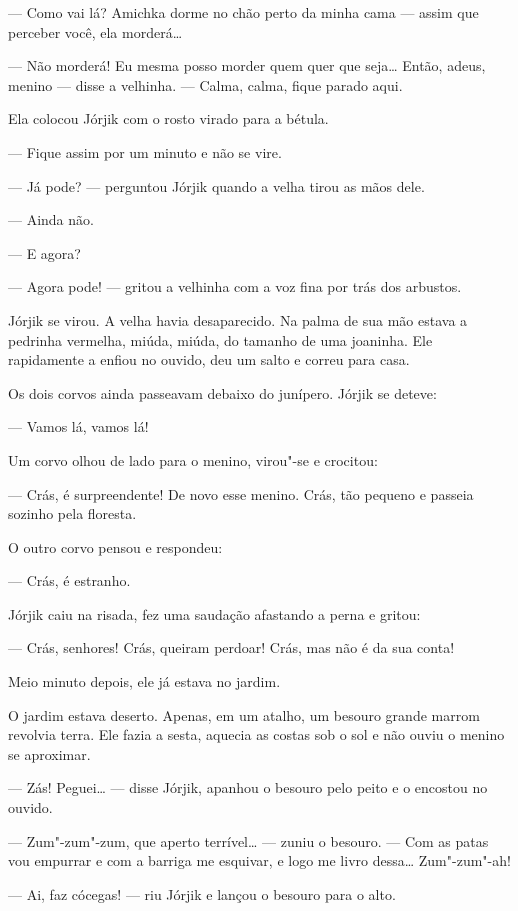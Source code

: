 --- Como vai lá? Amichka dorme no chão perto da minha cama --- assim que perceber você, ela morderá\ldots{}

--- Não morderá! Eu mesma posso morder quem quer que seja\ldots{} Então,
adeus, menino --- disse a velhinha. --- Calma, calma, fique parado aqui.

Ela colocou Jórjik com o rosto virado para a bétula.

--- Fique assim por um minuto e não se vire.

--- Já pode? --- perguntou Jórjik quando a velha tirou as mãos dele.

--- Ainda não.

--- E agora?

--- Agora pode! --- gritou a velhinha com a voz fina por trás dos
arbustos.

Jórjik se virou. A velha havia desaparecido. Na palma de sua mão estava
a pedrinha vermelha, miúda, miúda, do tamanho de uma joaninha. Ele
rapidamente a enfiou no ouvido, deu um salto e correu para casa.

Os dois corvos ainda passeavam debaixo do junípero. Jórjik se deteve:

--- Vamos lá, vamos lá!

Um corvo olhou de lado para o menino, virou"-se e crocitou:

--- Crás, é surpreendente! De novo esse menino. Crás, tão pequeno e
passeia sozinho pela floresta.

O outro corvo pensou e respondeu:

--- Crás, é estranho.

Jórjik caiu na risada, fez uma saudação afastando a perna e gritou:

--- Crás, senhores! Crás, queiram perdoar! Crás, mas não é da sua conta!

Meio minuto depois, ele já estava no jardim.

O jardim estava deserto. Apenas, em um atalho, um besouro grande marrom
revolvia terra. Ele fazia a sesta, aquecia as costas sob o sol e não
ouviu o menino se aproximar.

--- Zás! Peguei\ldots{} --- disse Jórjik, apanhou o besouro pelo peito e o
encostou no ouvido.

--- Zum"-zum"-zum, que aperto terrível\ldots{} --- zuniu o besouro. --- Com as
patas vou empurrar e com a barriga me esquivar, e logo me livro dessa\ldots{}
Zum"-zum"-ah!

--- Ai, faz cócegas! --- riu Jórjik e lançou o besouro para o alto.

